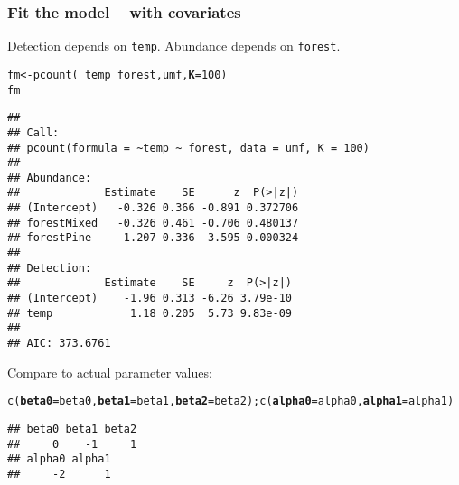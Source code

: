 \documentclass[color=usenames,dvipsnames]{beamer}\usepackage[]{graphicx}\usepackage[]{xcolor}
\makeatletter
\newcommand{\hlnum}[1]{\textcolor[rgb]{0.69,0.494,0}{#1}}%
\newcommand{\hlopt}[1]{\textcolor[rgb]{0,0,0}{#1}}%
\newcommand{\hlstd}[1]{\textcolor[rgb]{0,0,0}{#1}}%
\newcommand{\hlkwb}[1]{\textcolor[rgb]{0,0.341,0.682}{#1}}%
\newcommand{\hlkwc}[1]{\textcolor[rgb]{0,0,0}{\textbf{#1}}}%
\newcommand{\hlkwd}[1]{\textcolor[rgb]{0.004,0.004,0.506}{#1}}%
\newenvironment{kframe}{%
 \def\at@end@of@kframe{}%
 \ifinner\ifhmode%
  \def\at@end@of@kframe{\end{minipage}}%
  \begin{minipage}{\columnwidth}%
 \fi\fi%
 \def\FrameCommand##1{\hskip\@totalleftmargin \hskip-\fboxsep
 \colorbox{shadecolor}{##1}\hskip-\fboxsep
     \hskip-\linewidth \hskip-\@totalleftmargin \hskip\columnwidth}%
 \MakeFramed {\advance\hsize-\width
   \@totalleftmargin\z@ \linewidth\hsize
   \@setminipage}}%
 {\par\unskip\endMakeFramed%
 \at@end@of@kframe}
\newenvironment{knitrout}{}{} %
\makeatother
\begin{document}
\begin{frame}[fragile]
  \frametitle{Fit the model -- with covariates}
  \footnotesize
  Detection depends on {\tt temp}. Abundance depends on {\tt forest}.
\begin{knitrout}\tiny
{}\color{fgcolor}\begin{kframe}
\begin{alltt}
\hlstd{fm} \hlkwb{<-} \hlkwd{pcount}\hlstd{(}\hlopt{~}\hlstd{temp} \hlopt{~}\hlstd{forest, umf,} \hlkwc{K}\hlstd{=}\hlnum{100}\hlstd{)}
\hlstd{fm}
\end{alltt}
\begin{verbatim}
## 
## Call:
## pcount(formula = ~temp ~ forest, data = umf, K = 100)
## 
## Abundance:
##             Estimate    SE      z  P(>|z|)
## (Intercept)   -0.326 0.366 -0.891 0.372706
## forestMixed   -0.326 0.461 -0.706 0.480137
## forestPine     1.207 0.336  3.595 0.000324
## 
## Detection:
##             Estimate    SE     z  P(>|z|)
## (Intercept)    -1.96 0.313 -6.26 3.79e-10
## temp            1.18 0.205  5.73 9.83e-09
## 
## AIC: 373.6761
\end{verbatim}
\end{kframe}
\end{knitrout}
\pause
\vfill
Compare to actual parameter values:
\begin{knitrout}\tiny
{}\color{fgcolor}\begin{kframe}
\begin{alltt}
\hlkwd{c}\hlstd{(}\hlkwc{beta0}\hlstd{=beta0,} \hlkwc{beta1}\hlstd{=beta1,} \hlkwc{beta2}\hlstd{=beta2);} \hlkwd{c}\hlstd{(}\hlkwc{alpha0}\hlstd{=alpha0,} \hlkwc{alpha1}\hlstd{=alpha1)}
\end{alltt}
\begin{verbatim}
## beta0 beta1 beta2 
##     0    -1     1
## alpha0 alpha1 
##     -2      1
\end{verbatim}
\end{kframe}
\end{knitrout}
\end{frame}
\end{document}
